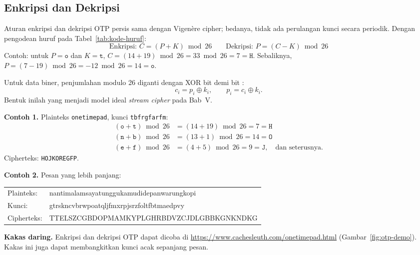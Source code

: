 \subsection{Enkripsi dan Dekripsi}

Aturan enkripsi dan dekripsi OTP persis sama dengan Vigen\`{e}re cipher; bedanya, tidak ada perulangan kunci secara periodik. Dengan pengodean huruf pada Tabel~\ref{tab:kode-huruf}:
\[
\text{Enkripsi: } C = (P + K) \bmod 26 \qquad
\text{Dekripsi: } P = (C - K) \bmod 26
\]
Contoh: untuk $P = \texttt{o}$ dan $K = \texttt{t}$, $C = (14 + 19) \bmod 26 = 33 \bmod 26 = 7 = \texttt{H}$. Sebaliknya, $P = (7 - 19) \bmod 26 = -12 \bmod 26 = 14 = \texttt{o}$.

Untuk data biner, penjumlahan modulo 26 diganti dengan XOR bit demi bit \cite{katz2020,stallings2017}:
\[
c_i = p_i \oplus k_i, \qquad p_i = c_i \oplus k_i.
\]
Bentuk inilah yang menjadi model ideal \textit{stream cipher} pada Bab~V.

\begin{contoh}
\textbf{Contoh 1.} Plainteks \texttt{onetimepad}, kunci \texttt{tbfrgfarfm}:
\begin{align*}
(\texttt{o} + \texttt{t}) \bmod 26 &= (14 + 19) \bmod 26 = 7 = \texttt{H} \\
(\texttt{n} + \texttt{b}) \bmod 26 &= (13 + 1) \bmod 26 = 14 = \texttt{O} \\
(\texttt{e} + \texttt{f}) \bmod 26 &= (4 + 5) \bmod 26 = 9 = \texttt{J}, \quad \text{dan seterusnya.}
\end{align*}
Cipherteks: \texttt{HOJKOREGFP}.

\medskip
\textbf{Contoh 2.} Pesan yang lebih panjang:
\begin{center}
\small\ttfamily
\begin{tabular}{ll}
  \rmfamily Plainteks: & nantimalamsayatunggukamudidepanwarungkopi \\
  \rmfamily Kunci: & gtrskncvbrwpoatqljfmxrpjsrzfoltfbtmaedpvy \\
  \rmfamily Cipherteks: & TTELSZCGBDOPMAMKYPLGHRBDVZCJDLGBBKGNKNDKG
\end{tabular}
\end{center}
\end{contoh}

\begin{catatan}
\textbf{Kakas daring.} Enkripsi dan dekripsi OTP dapat dicoba di \url{https://www.cachesleuth.com/onetimepad.html} (Gambar~\ref{fig:otp-demo}). Kakas ini juga dapat membangkitkan kunci acak sepanjang pesan.
\end{catatan}

